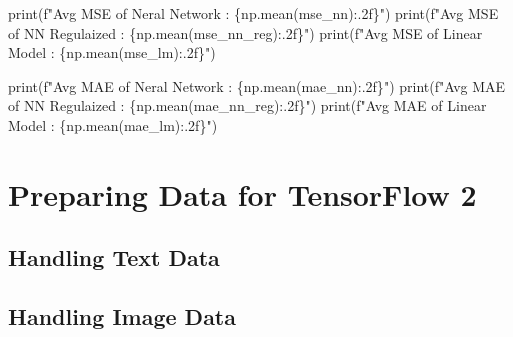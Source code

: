 \documentclass[
  letterpaper,
  DIV=11,
  numbers=noendperiod]{scrreprt}
\newenvironment{Shaded}{\begin{snugshade}}{\end{snugshade}}
\newcommand{\BuiltInTok}[1]{\textcolor[rgb]{0.00,0.23,0.31}{#1}}
\newcommand{\NormalTok}[1]{\textcolor[rgb]{0.00,0.23,0.31}{#1}}
\newcommand{\SpecialCharTok}[1]{\textcolor[rgb]{0.37,0.37,0.37}{#1}}
\newcommand{\SpecialStringTok}[1]{\textcolor[rgb]{0.13,0.47,0.30}{#1}}
\begin{document}
\begin{Shaded}
\begin{Highlighting}[]
\BuiltInTok{print}\NormalTok{(}\SpecialStringTok{f"Avg MSE of Neral Network : }\SpecialCharTok{\{}\NormalTok{np}\SpecialCharTok{.}\NormalTok{mean(mse\_nn)}\SpecialCharTok{:.2f\}}\SpecialStringTok{"}\NormalTok{)}
\BuiltInTok{print}\NormalTok{(}\SpecialStringTok{f"Avg MSE of NN Regulaized : }\SpecialCharTok{\{}\NormalTok{np}\SpecialCharTok{.}\NormalTok{mean(mse\_nn\_reg)}\SpecialCharTok{:.2f\}}\SpecialStringTok{"}\NormalTok{)}
\BuiltInTok{print}\NormalTok{(}\SpecialStringTok{f"Avg MSE of Linear Model  : }\SpecialCharTok{\{}\NormalTok{np}\SpecialCharTok{.}\NormalTok{mean(mse\_lm)}\SpecialCharTok{:.2f\}}\SpecialStringTok{"}\NormalTok{)}
\end{Highlighting}
\end{Shaded}

\begin{Shaded}
\begin{Highlighting}[]
\BuiltInTok{print}\NormalTok{(}\SpecialStringTok{f"Avg MAE of Neral Network : }\SpecialCharTok{\{}\NormalTok{np}\SpecialCharTok{.}\NormalTok{mean(mae\_nn)}\SpecialCharTok{:.2f\}}\SpecialStringTok{"}\NormalTok{)}
\BuiltInTok{print}\NormalTok{(}\SpecialStringTok{f"Avg MAE of NN Regulaized : }\SpecialCharTok{\{}\NormalTok{np}\SpecialCharTok{.}\NormalTok{mean(mae\_nn\_reg)}\SpecialCharTok{:.2f\}}\SpecialStringTok{"}\NormalTok{)}
\BuiltInTok{print}\NormalTok{(}\SpecialStringTok{f"Avg MAE of Linear Model  : }\SpecialCharTok{\{}\NormalTok{np}\SpecialCharTok{.}\NormalTok{mean(mae\_lm)}\SpecialCharTok{:.2f\}}\SpecialStringTok{"}\NormalTok{)}
\end{Highlighting}
\end{Shaded}

\part{{Preparing Data for TensorFlow 2}}

\hypertarget{handling-text-data}{%
\chapter{Handling Text Data}\label{handling-text-data}}

\hypertarget{handling-image-data}{%
\chapter{Handling Image Data}\label{handling-image-data}}
\end{document}
